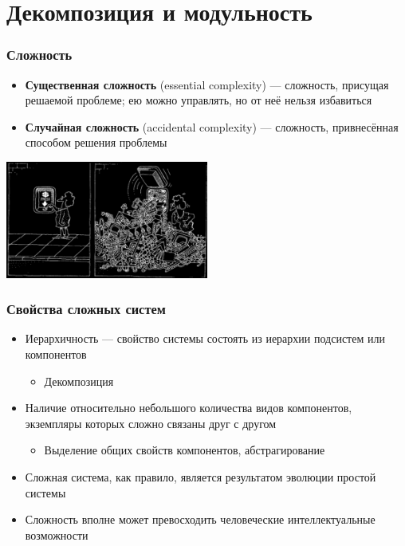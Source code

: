 \documentclass{../cscslides}
\begin{document}
    \frame{\titlepage}

    \section{Декомпозиция и модульность}

    \begin{frame}
        \frametitle{Сложность}
        \begin{itemize}
            \item \textbf{Существенная сложность} (essential complexity) --- сложность, присущая решаемой проблеме; ею можно управлять, но от неё нельзя избавиться
            \item \textbf{Случайная сложность} (accidental complexity) --- сложность, привнесённая способом решения проблемы
        \end{itemize}
        \vskip 0.5cm
        \begin{center}
            \includegraphics[width=0.5\textwidth]{complexityHidingBlack.png}
        \end{center}
    \end{frame}

    \begin{frame}
        \frametitle{Свойства сложных систем}
        \begin{itemize}
            \item Иерархичность --- свойство системы состоять из иерархии подсистем или компонентов
            \begin{itemize}
                \item Декомпозиция
            \end{itemize}
            \item Наличие относительно небольшого количества видов компонентов, экземпляры которых сложно связаны друг с другом
            \begin{itemize}
                \item Выделение общих свойств компонентов, абстрагирование
            \end{itemize}
            \item Сложная система, как правило, является результатом эволюции простой системы
            \item Сложность вполне может превосходить человеческие интеллектуальные возможности
        \end{itemize}
    \end{frame}
\end{document}
